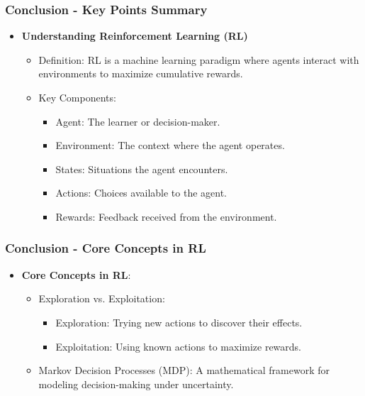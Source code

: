 \documentclass[aspectratio=169]{beamer}
\begin{document}
\begin{frame}[fragile]
    \frametitle{Conclusion - Key Points Summary}
    \begin{itemize}
        \item \textbf{Understanding Reinforcement Learning (RL)}
            \begin{itemize}
                \item Definition: RL is a machine learning paradigm where agents interact with environments to maximize cumulative rewards.
                \item Key Components:
                    \begin{itemize}
                        \item Agent: The learner or decision-maker.
                        \item Environment: The context where the agent operates.
                        \item States: Situations the agent encounters.
                        \item Actions: Choices available to the agent.
                        \item Rewards: Feedback received from the environment.
                    \end{itemize}
            \end{itemize}
    \end{itemize}
\end{frame}

\begin{frame}[fragile]
    \frametitle{Conclusion - Core Concepts in RL}
    \begin{itemize}
        \item \textbf{Core Concepts in RL}:
            \begin{itemize}
                \item Exploration vs. Exploitation:
                    \begin{itemize}
                        \item Exploration: Trying new actions to discover their effects.
                        \item Exploitation: Using known actions to maximize rewards.
                    \end{itemize}
                \item Markov Decision Processes (MDP): A mathematical framework for modeling decision-making under uncertainty.
            \end{itemize}
    \end{itemize}
\end{frame}
\end{document}
